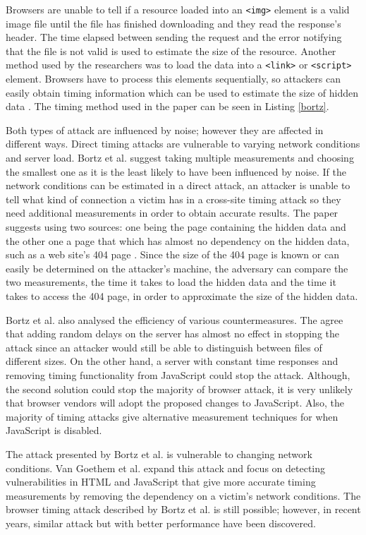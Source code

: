\documentclass[10pt,a4paper,twoside]{book}
\begin{document}
Browsers are unable to tell if a resource loaded into an \texttt{<img>} element is a valid image file until the file has finished downloading and they read the response's header. The time elapsed between sending the request and the error notifying that the file is not valid is used to estimate the size of the resource. Another method used by the researchers was to load the data into a \texttt{<link>} or \texttt{<script>} element. Browsers have to process this elements sequentially, so attackers can easily obtain timing information which can be used to estimate the size of hidden data \cite{bortz2007exposing}. The timing method used in the paper can be seen in Listing \ref{bortz}.

Both types of attack are influenced by noise; however they are affected in different ways. Direct timing attacks are vulnerable to varying network conditions and server load. Bortz et al. suggest taking multiple measurements and choosing the smallest one as it is the least likely to have been influenced by noise. If the network conditions can be estimated in a direct attack, an attacker is unable to tell what kind of connection a victim has in a cross-site timing attack so they need additional measurements in order to obtain accurate results. The paper suggests using two sources: one being the page containing the hidden data and the other one a page that which has almost no dependency on the hidden data, such as a web site's 404 page \cite{bortz2007exposing}. 
Since the size of the 404 page is known or can easily be determined on the attacker's machine, the adversary can compare the two measurements, the time it takes to load the hidden data and the time it takes to access the 404 page, in order to approximate the size of the hidden data.

Bortz et al. also analysed the efficiency of various countermeasures. The agree that adding random delays on the server has almost no effect in stopping the attack since an attacker would still be able to distinguish between files of different sizes. On the other hand, a server with constant time responses and removing timing functionality from JavaScript could stop the attack. Although, the second solution could stop the majority of browser attack, it is very unlikely that browser vendors will adopt the proposed changes to JavaScript. Also, the majority of timing attacks give alternative measurement techniques for when JavaScript is disabled.

The attack presented by Bortz et al. \cite{bortz2007exposing} is vulnerable to changing network conditions. Van Goethem et al. \cite{van2015clock} expand this attack and focus on detecting vulnerabilities in HTML and JavaScript that give more accurate timing measurements by removing the dependency on a victim's network  conditions. The browser timing attack described by Bortz et al. \cite{bortz2007exposing} is still possible; however, in recent years, similar attack but with better performance have been discovered. 
\end{document}
